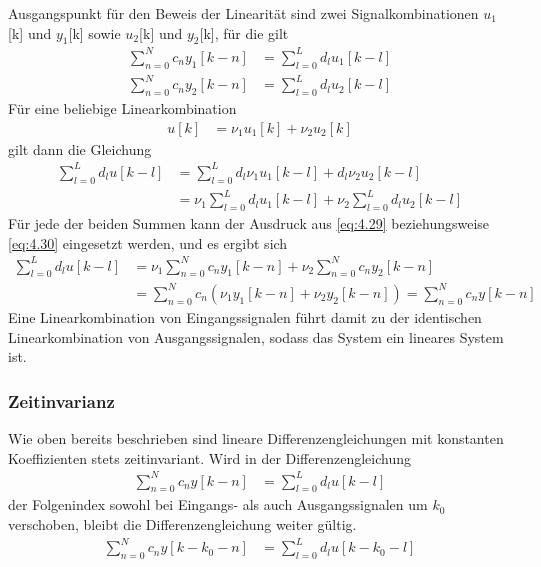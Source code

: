 Ausgangspunkt für den Beweis der Linearität sind zwei Signalkombinationen \(u_{1}\){[}k{]} und \(y_{1}\){[}k{]} sowie \(u_{2}\){[}k{]} und \(y_{2}\){[}k{]}, für die gilt
\begin{align}
\sum\limits_{n = 0}^{N}{c_{n}  y_{1}[ k - n]} &= \sum\limits_{l = 0}^{L}{d_{l}  u_{1}[ k - l]} \label{eq:4.29} \\
\sum\limits_{n = 0}^{N}{c_{n}  y_{2}[ k - n]} &= \sum\limits_{l = 0}^{L}{d_{l}  u_{2}[ k - l]} \label{eq:4.30}
\end{align}
Für eine beliebige Linearkombination
\begin{align}
u[ k] &= \nu_{1}  u_{1}[ k] + \nu_{2}  u_{2}[ k] \label{eq:4.31}
\end{align}
gilt dann die Gleichung
\begin{align}
{\sum\limits _{l=0}^{L}d_{l}  u\left[k-l\right] } &=  {\sum\limits _{l=0}^{L}d_{l}  \nu _{1}  u_{1} \left[k-l\right]+d_{l}  \nu _{2}  u_{2} \left[k-l\right] } \\
{} &=  {\nu _{1}  \sum\limits _{l=0}^{L}d_{l}  u_{1} \left[k-l\right] +\nu _{2}  \sum\limits _{l=0}^{L}d_{l}  u_{2} \left[k-l\right] }
\label{eq:4.32}
\end{align}
Für jede der beiden Summen kann der Ausdruck aus \eqref{eq:4.29} beziehungsweise \eqref{eq:4.30} eingesetzt werden, und es ergibt sich
\begin{align}
{\sum\limits _{l=0}^{L}d_{l}  u\left[k-l\right] } &=  {\nu _{1}  \sum\limits _{n=0}^{N}c_{n}  y_{1} \left[k-n\right] +\nu _{2}  \sum\limits _{n=0}^{N}c_{n}  y_{2} \left[k-n\right] } \\
{} &=  {\sum\limits _{n=0}^{N}c_{n}  \left(\nu _{1}  y_{1} \left[k-n\right]+\nu _{2}  y_{2} \left[k-n\right]\right) =\sum\limits _{n=0}^{N}c_{n}  y\left[k-n\right] }
\label{eq:4.33}
\end{align}
Eine Linearkombination von Eingangssignalen führt damit zu der identischen Linearkombination von Ausgangssignalen, sodass das System ein lineares System ist.

\subsubsection{Zeitinvarianz}\label{sec:zeitinvarianz-1}

Wie oben bereits beschrieben sind lineare Differenzengleichungen mit konstanten Koeffizienten stets zeitinvariant. Wird in der Differenzengleichung
\begin{align}
\sum\limits_{n = 0}^{N}{c_{n}  y[ k - n]} &= \sum\limits_{l = 0}^{L}{d_{l}  u[ k - l]} \label{eq:4.34}
\end{align}
der Folgenindex sowohl bei Eingangs- als auch Ausgangssignalen um \(k_{0}\) verschoben, bleibt die Differenzengleichung weiter gültig.
\begin{align}
\sum\limits_{n = 0}^{N}{c_{n}  y\left[ k - k_{0} - n \right]} &= \sum\limits_{l = 0}^{L}{d_{l}  u\left[ k - k_{0} - l \right]} \label{eq:4.35}
\end{align}
